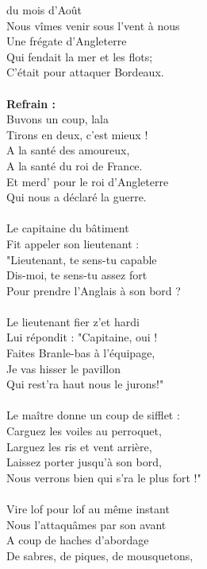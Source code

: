  du mois d'Août ~~~~~~~~ \bissimple
\\Nous vîmes venir sous l'vent à nous ~\bissimple
\\Une frégate d'Angleterre
\\Qui fendait la mer et les flots;
\\C'était pour attaquer Bordeaux.
\\\\\textbf{Refrain :}
\\Buvons un coup, lala
\\Tirons en deux, c'est mieux !
\\A la santé des amoureux, 
\\ A la santé du roi de France.
\\Et merd' pour le roi d'Angleterre 
\\Qui nous a déclaré la guerre.
\\\\Le capitaine du bâtiment ~~~~ \bissimple
\\Fit appeler son lieutenant : ~~ \bissimple
\\"Lieutenant, te sens-tu capable 
\\Dis-moi, te sens-tu assez fort
\\Pour prendre l'Anglais à son bord ?
\\\\Le lieutenant fier z'et hardi ~~~~~~~~ \bissimple
\\Lui répondit : "Capitaine, oui ! ~~ \bissimple
\\Faites Branle-bas à l'équipage,
\\Je vas hisser le pavillon
\\Qui rest'ra haut nous le jurons!" 
\\\\Le maître donne un coup de sifflet : ~~~~\bissimple
\\Carguez les voiles au perroquet, ~~~~~~~ \bissimple
\\Larguez les ris et vent arrière,
\\Laissez porter jusqu'à son bord,
\\Nous verrons bien qui s'ra le plus fort !"
\\\\Vire lof pour lof au même instant ~~~~~\bissimple
\\Nous l'attaquâmes par son avant ~~\bissimple
\\A coup de haches d'abordage
\\De sabres, de piques, de mousquetons,
